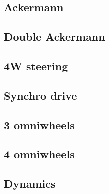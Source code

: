 \subsection{Ackermann}

\subsection{Double Ackermann}

\subsection{4W steering}

\subsection{Synchro drive}

\subsection{3 omniwheels}

\subsection{4 omniwheels}


\subsection{Dynamics}



